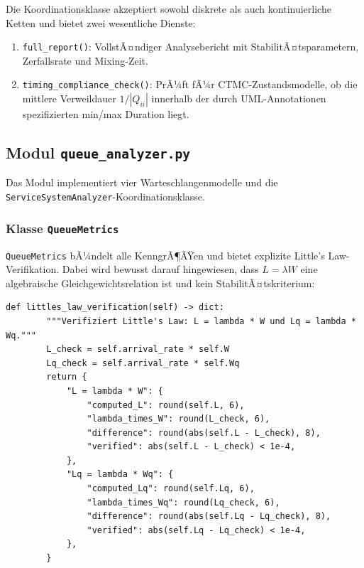 ﻿\documentclass[a4paper,12pt]{scrreprt}
\theoremstyle{definition}
\begin{document}
Die Koordinationsklasse akzeptiert sowohl diskrete als auch kontinuierliche
Ketten und bietet zwei wesentliche Dienste:

\begin{enumerate}
	\item[-] \texttt{full\_report()}: VollstÃ¤ndiger Analysebericht mit
	StabilitÃ¤tsparametern, Zerfallsrate und Mixing-Zeit.
	\item[-] \texttt{timing\_compliance\_check()}: PrÃ¼ft fÃ¼r CTMC-Zustandsmodelle,
	ob die mittlere Verweildauer $1/|Q_{ii}|$ innerhalb der durch
	UML-Annotationen spezifizierten min/max Duration liegt.
\end{enumerate}

\subsection{Modul \texttt{queue\_analyzer.py}}
\label{sec:queue-analyzer-impl}

Das Modul implementiert vier Warteschlangenmodelle und die
\texttt{ServiceSystemAnaly\newline zer}-Koordinationsklasse.

\subsubsection{Klasse \texttt{QueueMetrics}}

\texttt{QueueMetrics} bÃ¼ndelt alle KenngrÃ¶ÃŸen und bietet explizite
Little's Law-Verifikation. Dabei wird bewusst darauf hingewiesen, dass
$L = \lambda W$ eine algebraische Gleichgewichtsrelation ist und kein
StabilitÃ¤tskriterium:

\begin{lstlisting}[style=python, caption={Little's Law Verifikation mit theoretischem Hinweis}, label=lst:littles-law-impl]
def littles_law_verification(self) -> dict:
        """Verifiziert Little's Law: L = lambda * W und Lq = lambda * Wq."""
        L_check = self.arrival_rate * self.W
        Lq_check = self.arrival_rate * self.Wq
        return {
            "L = lambda * W": {
                "computed_L": round(self.L, 6),
                "lambda_times_W": round(L_check, 6),
                "difference": round(abs(self.L - L_check), 8),
                "verified": abs(self.L - L_check) < 1e-4,
            },
            "Lq = lambda * Wq": {
                "computed_Lq": round(self.Lq, 6),
                "lambda_times_Wq": round(Lq_check, 6),
                "difference": round(abs(self.Lq - Lq_check), 8),
                "verified": abs(self.Lq - Lq_check) < 1e-4,
            },
        }
\end{lstlisting}
\end{document}
